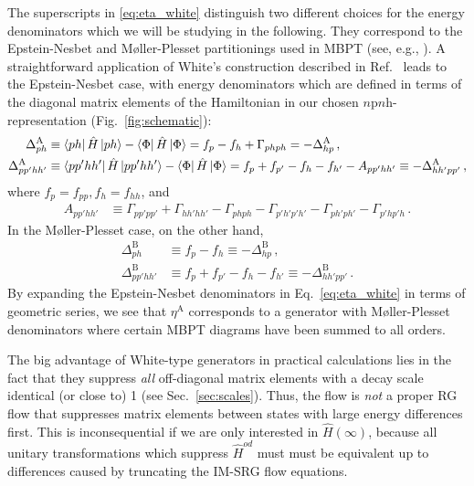 The superscripts in \eqref{eq:eta_white} distinguish two different choices for the energy denominators which we will be studying in the following. They correspond to the Epstein-Nesbet and M{\o}ller-Plesset partitionings used in MBPT (see, e.g., \cite{shavittbartlett2009}). A straightforward application of White's construction described in Ref.~\cite{white200} leads to the Epstein-Nesbet case, with energy denominators which are defined in terms of the diagonal matrix elements of the Hamiltonian in our chosen $n$p$n$h-representation (Fig.~\ref{fig:schematic}):
\begin{align}
  \Delta^\text{A}_{ph} &\equiv \matrixe{ph}{\hat{H}}{ph} - \matrixe{\Phi}{\hat{H}}{\Phi}
                  = f_p - f_h + \Gamma_{phph} = - \Delta^\text{A}_{hp} \,,\label{eq:eden1b_en}\\  
  \Delta^\text{A}_{pp'hh'} &\equiv \matrixe{pp'hh'}{\hat{H}}{pp'hh'} - \matrixe{\Phi}{\hat{H}}{\Phi}
                  = f_p + f_{p'} - f_h - f_{h'} - A_{pp'hh'} \equiv - \Delta^\text{A}_{hh'pp'} \,,\label{eq:eden2b_en}
\end{align}
where $f_{p}=f_{pp}, f_{h}=f_{hh}$, and
\begin{align}
  A_{pp'hh'}&\equiv\Gamma_{pp'pp'}+\Gamma_{hh'hh'}-\Gamma_{phph}
       -\Gamma_{p'h'p'h'}-\Gamma_{ph'ph'}-\Gamma_{p'hp'h}\,.\label{eq:def_A}
\end{align}
In the M{\o}ller-Plesset case, on the other hand, 
\begin{align}
  \Delta^\text{B}_{ph}     &\equiv f_p - f_h \equiv - \Delta^\text{B}_{hp} \,, \label{eq:eden1b_mp}\\  
  \Delta^\text{B}_{pp'hh'} &\equiv f_p + f_{p'} - f_h - f_{h'} \equiv - \Delta^\text{B}_{hh'pp'}\,.\label{eq:eden2b_mp}
\end{align}
By expanding the Epstein-Nesbet denominators in
Eq.~\eqref{eq:eta_white} in terms of geometric series, we see that
$\eta^\text{A}$ corresponds to a generator with M{\o}ller-Plesset
denominators where certain MBPT diagrams have been summed to all
orders.


The big advantage of White-type generators in practical calculations
lies in the fact that they suppress \emph{all} off-diagonal matrix
elements with a decay scale identical (or close to) 1 (see
Sec.~\ref{sec:scales}). Thus, the flow is \emph{not} a proper RG flow
that suppresses matrix elements between states with large energy
differences first. This is inconsequential if we are only interested
in $\hat{H}(\infty)$, because all unitary transformations which
suppress $\hat{H}^{od}$ must must be equivalent up to differences
caused by truncating the IM-SRG flow equations.

